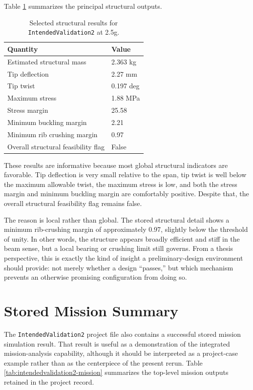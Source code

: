 \documentclass[12pt]{report}
\begin{document}
Table \ref{tab:intendedvalidation2-struct} summarizes the principal structural outputs.

\begin{table}[htbp]
\centering
\caption{Selected structural results for \texttt{IntendedValidation2} at 2.5g.}
\label{tab:intendedvalidation2-struct}
\begin{tabular}{ll}
\toprule
\textbf{Quantity} & \textbf{Value} \\
\midrule
Estimated structural mass & 2.363 kg \\
Tip deflection & 2.27 mm \\
Tip twist & 0.197 deg \\
Maximum stress & 1.88 MPa \\
Stress margin & 25.58 \\
Minimum buckling margin & 2.21 \\
Minimum rib crushing margin & 0.97 \\
Overall structural feasibility flag & False \\
\bottomrule
\end{tabular}
\end{table}

These results are informative because most global structural indicators are favorable. Tip deflection is very small relative to the span, tip twist is well below the maximum allowable twist, the maximum stress is low, and both the stress margin and minimum buckling margin are comfortably positive. Despite that, the overall structural feasibility flag remains false.

The reason is local rather than global. The stored structural detail shows a minimum rib-crushing margin of approximately 0.97, slightly below the threshold of unity. In other words, the structure appears broadly efficient and stiff in the beam sense, but a local bearing or crushing limit still governs. From a thesis perspective, this is exactly the kind of insight a preliminary-design environment should provide: not merely whether a design ``passes,'' but which mechanism prevents an otherwise promising configuration from doing so.

\section{Stored Mission Summary}
The \texttt{IntendedValidation2} project file also contains a successful stored mission simulation result. That result is useful as a demonstration of the integrated mission-analysis capability, although it should be interpreted as a project-case example rather than as the centerpiece of the present rerun. Table \ref{tab:intendedvalidation2-mission} summarizes the top-level mission outputs retained in the project record.
\end{document}

